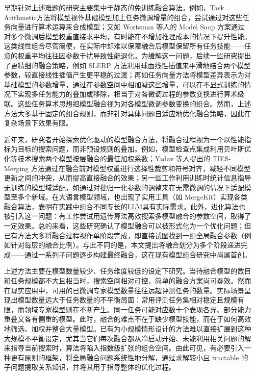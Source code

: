 \documentclass[../main.tex]{subfiles}
\begin{document}
早期针对上述难题的研究主要集中于静态的免训练融合算法。例如，Task Arithmetic方法\cite{editingmodelstask_ilharco_2023}将模型视作基础模型加上任务微调增量的组合，尝试通过对这些任务向量进行算术运算来合成模型；又如 Wortsman 等人的 Model Soup 方案\cite{modelsoupsaveraging_wortsman_2022}通过对多个微调后模型权重直接求平均，有时能在不增加推理成本的情况下提升性能。这类线性组合尽管简便，在实际中却难以保障融合后模型保留所有任务技能——任意的权重平均往往因参数干扰导致性能退化。为缓解这一问题，后续一些研究提出了更精细的融合策略，例如 SLERP 方法\cite{shoemake1985slerp}利用球面线性插值来平滑地结合两个模型参数，较直接线性插值产生更平稳的过渡；再如任务向量方法\cite{editingmodelstask_ilharco_2023}将模型差异表示为对基础模型的参数增量，通过在参数空间中相加减这些增量，可以在不显式训练的情况下实现多任务能力的叠加或移除，相当于对各微调过程的参数变换进行算术级联。这些任务算术思想把模型融合视为对各模型微调参数变换的组合。然而，上述方法大多基于固定的组合规则，而非针对具体问题自适应地优化融合策略，因此在复杂场景下效果有限。

近年来，研究者开始探索优化驱动的模型融合方法，将融合过程视为一个以性能指标为目标的搜索问题，而非预设规则的叠加。例如，模型检查点集成利用贝叶斯优化等技术搜索两个模型按层融合的最佳加权系数\cite{practicalbayesianoptimization_snoek_2012}；Yadav 等人提出的 TIES-Merging 方法\cite{tiesmergingresolving_yadav_2023}通过在融合前对模型权重进行选择性裁剪和符号对齐，减轻不同模型更新之间的冲突，从而提高直接融合的效果；另一些工作利用训练时统计信息指导无训练的模型域适配，如通过对批归一化参数的调整来在无需微调的情况下适配模型至多个新域。在大语言模型领域，也出现了实用工具（如 MergeKit）实现各类融合算法\cite{mergekit_github}，表明在实践中组合不同专长的LLM具有实际需求。此外，进化算法也被引入这一问题：有工作尝试用遗传算法高效搜索多模型融合的参数空间，取得了一定效果\cite{geneticalgorithms_holland_1992}。总的来看，这些研究确认了模型融合可以被形式化为一个优化问题；但已有方法大多将融合过程视作单阶段完成，即直接试图找到一组全局融合参数（例如针对每层的融合比例）。与此不同的是，本文提出将融合划分为多个阶段递进完成——通过一系列子问题逐步构建最终融合，这在现有模型组合研究中尚属首创。

上述方法主要在模型数量较少、任务维度较低的设定下研究。当待融合模型的数目和任务规模都不大且相当时，搜索空间相对可控，简单的融合方案尚可奏效。然而在现实应用中，可用的已微调专家模型数量往往远超评测任务的数量。实际场景呈现出模型数量远大于任务数量的不平衡局面：常用评测任务集相对稳定且规模有限，而领域专家模型则在不断产生。同一任务可能对应数十个表现各异、部分能力重叠又各有侧重的模型。此时，融合的难点不在于缺少模型技能，而在于如何高效地筛选、加权并整合大量模型。已有为小规模情形设计的方法难以直接扩展到这种大规模不平衡设定，尤其当它们每次融合都从冷启动开始、未能利用相关问题的解来指导当前搜索时，算法将陷入指数级扩张的组合空间。由此可见，有必要引入一种更有原则的框架，将全局融合问题系统性地分解，通过求解较小且 tractable 的子问题提取关系知识，并将其用于指导整体的优化过程。
\end{document}
